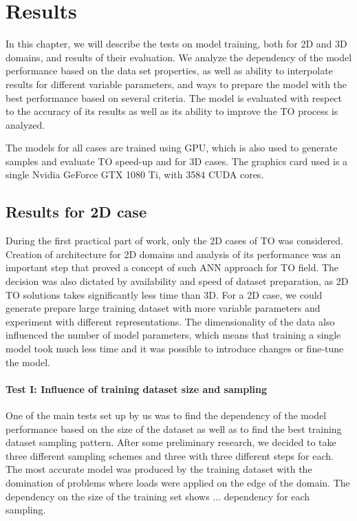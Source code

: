 
\chapter{Results}
\label{chapter:Results}

In this chapter, we will describe the tests on model training, both for 2D and 3D domains, and results of their evaluation.
We analyze the dependency of the model performance based on the data set properties, as well as ability to interpolate results for different variable parameters, and ways to prepare the model with the best performance based on several criteria. 
The model is evaluated with respect to the accuracy of its results as well as its ability to improve the TO process is analyzed.

The models for all cases are trained using GPU, which is also used to generate samples and evaluate TO speed-up and for 3D cases.
The graphics card used is a single Nvidia GeForce GTX 1080 Ti, with 3584 CUDA cores. 


\section{Results for 2D case}

During the first practical part of work, only the 2D cases of TO was considered.
Creation of architecture for 2D domains and analysis of its performance was an important step that proved a concept of such ANN approach for TO field.
The decision was also dictated by availability and speed of dataset preparation, as 2D TO solutions takes significantly less time than 3D. 
For a 2D case, we could generate prepare large training dataset with more variable parameters and experiment with different representations.
The dimensionality of the data also influenced the number of model parameters, which means that training a single model took much less time and it was possible to introduce changes or fine-tune the model.

\medskip

\subsubsection{Test I: Influence of training dataset size and sampling}
One of the main tests set up by us was to find the dependency of the model performance based on the size of the dataset as well as to find the best training dataset sampling pattern.
After some preliminary research, we decided to take three different sampling schemes and three with three different steps for each. 
The most accurate model was produced by the training dataset with the domination of problems where loads were applied on the edge of the domain.
The dependency on the size of the training set shows ...  dependency for each sampling.
\medskip

